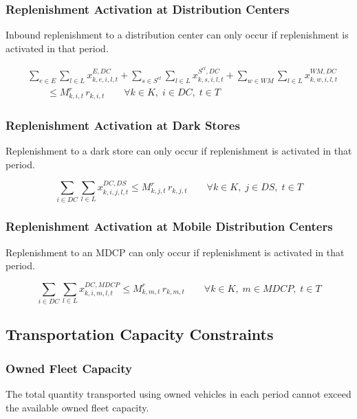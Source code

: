 \documentclass[12pt]{article}
\begin{document}
\subsubsection{Replenishment Activation at Distribution Centers}

Inbound replenishment to a distribution center can only occur if replenishment is activated in that period.

\begin{align*}
& \sum_{e \in E}\sum_{l \in L} x^{E,DC}_{k,e,i,l,t}
+ \sum_{s \in S^{cl}}\sum_{l \in L} x^{S^{cl},DC}_{k,s,i,l,t}
+ \sum_{w \in WM}\sum_{l \in L} x^{WM,DC}_{k,w,i,l,t}
\\
& \qquad \leq M^{r}_{k,i,t}\, r_{k,i,t}
\qquad
\forall k \in K,\; i \in DC,\; t \in T
\end{align*}

\subsubsection{Replenishment Activation at Dark Stores}

Replenishment to a dark store can only occur if replenishment is activated in that period.

\[
\sum_{i \in DC}\sum_{l \in L} x^{DC,DS}_{k,i,j,l,t}
\leq
M^{r}_{k,j,t}\, r_{k,j,t}
\qquad
\forall k \in K,\; j \in DS,\; t \in T
\]

\subsubsection{Replenishment Activation at Mobile Distribution Centers}

Replenishment to an MDCP can only occur if replenishment is activated in that period.

\[
\sum_{i \in DC}\sum_{l \in L} x^{DC,MDCP}_{k,i,m,l,t}
\leq
M^{r}_{k,m,t}\, r_{k,m,t}
\qquad
\forall k \in K,\; m \in MDCP,\; t \in T
\]

\subsection{Transportation Capacity Constraints}

\subsubsection{Owned Fleet Capacity}

The total quantity transported using owned vehicles in each period cannot exceed the available owned fleet capacity.
\end{document}
